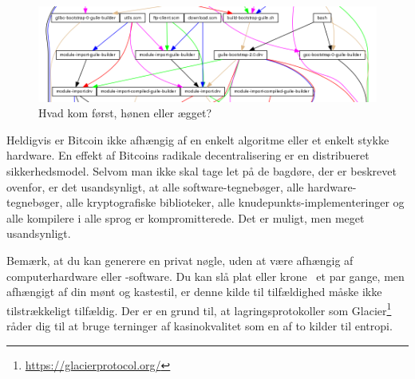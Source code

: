 \documentclass[paper=6in:9in,pagesize=pdftex,headinclude=on,footinclude=on,12pt]{scrbook}
\begin{document}
\begin{figure}
  \includegraphics{assets/images/guix-bootstrap-dependencies.png}
  \caption{Hvad kom først, hønen eller ægget?}
  \label{fig:guix-bootstrap-dependencies}
\end{figure}

Heldigvis er Bitcoin ikke afhængig af en enkelt algoritme eller et enkelt stykke hardware. En effekt af Bitcoins radikale decentralisering er en distribueret sikkerhedsmodel. Selvom man ikke skal tage let på de bagdøre, der er beskrevet ovenfor, er det usandsynligt, at alle software-tegnebøger, alle hardware-tegnebøger, alle kryptografiske biblioteker, alle knudepunkts-implementeringer og alle kompilere i alle sprog er kompromitterede. Det er muligt, men meget usandsynligt.

Bemærk, at du kan generere en privat nøgle, uden at være afhængig af computerhardware eller -software. Du kan slå plat eller krone~\cite{antonopoulos2014mastering} et par gange, men afhængigt af din mønt og kastestil, er denne kilde til tilfældighed måske ikke tilstrækkeligt tilfældig. Der er en grund til, at lagringsprotokoller som Glacier\footnote{\url{https://glacierprotocol.org/}} råder dig til at bruge terninger af kasinokvalitet som en af to kilder til entropi.
\end{document}

